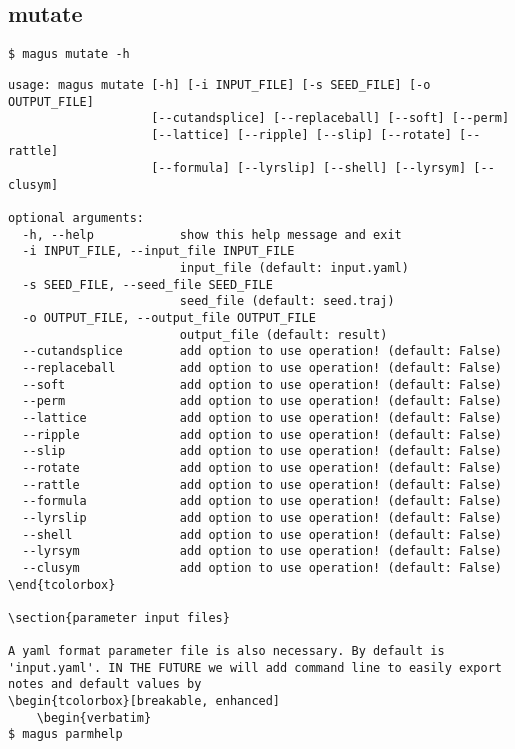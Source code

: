\documentclass[12pt,oneside]{book}
\begin{document}
\subsection{mutate}
\begin{tcolorbox}
    \begin{verbatim}
$ magus mutate -h
    \end{verbatim}
    \tcblower
    \begin{verbatim}
usage: magus mutate [-h] [-i INPUT_FILE] [-s SEED_FILE] [-o OUTPUT_FILE]
                    [--cutandsplice] [--replaceball] [--soft] [--perm]
                    [--lattice] [--ripple] [--slip] [--rotate] [--rattle]
                    [--formula] [--lyrslip] [--shell] [--lyrsym] [--clusym]

optional arguments:
  -h, --help            show this help message and exit
  -i INPUT_FILE, --input_file INPUT_FILE
                        input_file (default: input.yaml)
  -s SEED_FILE, --seed_file SEED_FILE
                        seed_file (default: seed.traj)
  -o OUTPUT_FILE, --output_file OUTPUT_FILE
                        output_file (default: result)
  --cutandsplice        add option to use operation! (default: False)
  --replaceball         add option to use operation! (default: False)
  --soft                add option to use operation! (default: False)
  --perm                add option to use operation! (default: False)
  --lattice             add option to use operation! (default: False)
  --ripple              add option to use operation! (default: False)
  --slip                add option to use operation! (default: False)
  --rotate              add option to use operation! (default: False)
  --rattle              add option to use operation! (default: False)
  --formula             add option to use operation! (default: False)
  --lyrslip             add option to use operation! (default: False)
  --shell               add option to use operation! (default: False)
  --lyrsym              add option to use operation! (default: False)
  --clusym              add option to use operation! (default: False)
\end{tcolorbox}

\section{parameter input files}

A yaml format parameter file is also necessary. By default is 'input.yaml'. IN THE FUTURE we will add command line to easily export notes and default values by
\begin{tcolorbox}[breakable, enhanced]
    \begin{verbatim}
$ magus parmhelp
    \end{verbatim}
\end{tcolorbox}
\end{document}
